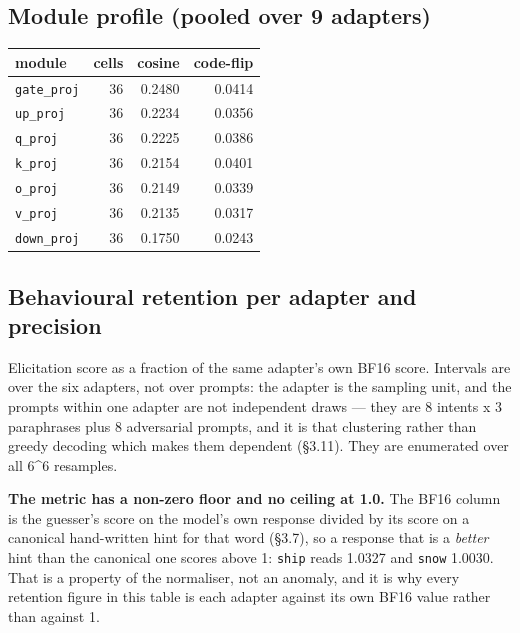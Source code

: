\subsection{Module profile (pooled over 9 adapters)}

\begin{center}\footnotesize
\begin{tabular}{lrrr}
\toprule
module & cells & cosine & code-flip \\
\midrule
\texttt{gate\_\allowbreak{}proj} & 36 & 0.2480 & 0.0414 \\
\texttt{up\_\allowbreak{}proj} & 36 & 0.2234 & 0.0356 \\
\texttt{q\_\allowbreak{}proj} & 36 & 0.2225 & 0.0386 \\
\texttt{k\_\allowbreak{}proj} & 36 & 0.2154 & 0.0401 \\
\texttt{o\_\allowbreak{}proj} & 36 & 0.2149 & 0.0339 \\
\texttt{v\_\allowbreak{}proj} & 36 & 0.2135 & 0.0317 \\
\texttt{down\_\allowbreak{}proj} & 36 & 0.1750 & 0.0243 \\
\bottomrule
\end{tabular}
\end{center}

\subsection{Behavioural retention per adapter and precision}

Elicitation score as a fraction of the same adapter's own BF16 score. Intervals are over the six adapters, not over prompts: the adapter is the sampling unit, and the prompts within one adapter are not independent draws --- they are 8 intents x 3 paraphrases plus 8 adversarial prompts, and it is that clustering rather than greedy decoding which makes them dependent (\S{}3.11). They are enumerated over all 6\textasciicircum{}6 resamples.

\textbf{The metric has a non-zero floor and no ceiling at 1.0.} The BF16 column is the guesser's score on the model's own response divided by its score on a canonical hand-written hint for that word (\S{}3.7), so a response that is a \emph{better} hint than the canonical one scores above 1: \texttt{ship} reads 1.0327 and \texttt{snow} 1.0030. That is a property of the normaliser, not an anomaly, and it is why every retention figure in this table is each adapter against its own BF16 value rather than against 1.

